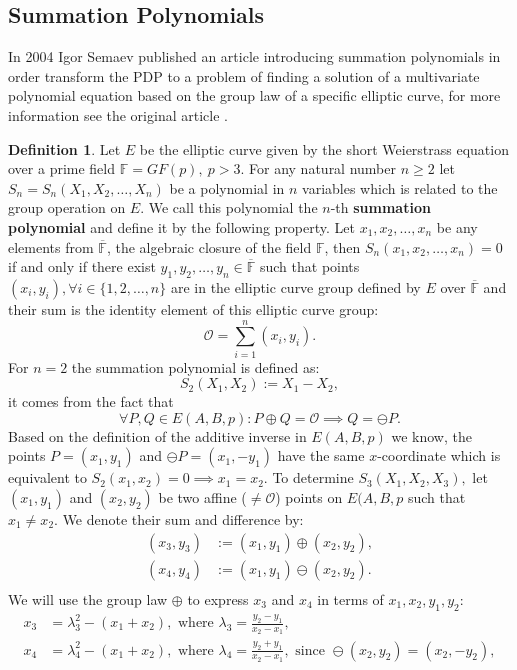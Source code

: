 \documentclass[thesis=M,english]{FITthesis}[2012/10/20]
\theoremstyle{remark}
\theoremstyle{definition}
\newtheorem{DF}{Definition}[section]
\begin{document}
\subsection{Summation Polynomials}
\noindent In 2004 Igor Semaev published an article introducing summation polynomials in order transform the PDP to a problem of finding a solution of a multivariate polynomial equation based on the group law of a specific elliptic curve, for more information see the original article \cite{semaev04}.
\begin{DF}
Let $E$ be the elliptic curve given by the short Weierstrass equation over a prime field $\mathbb{F} = GF(p),\ p > 3$. For any natural number $n \geq 2$ let $S_n = S_n(X_1, X_2, \ldots, X_n)$ be a polynomial in $n$ variables which is related to the group operation on $E$. We call this polynomial the $n$-th \textbf{summation polynomial} and define it by the following property. Let $x_1,x_2,\ldots,x_n$ be any elements from $\overline{\mathbb{F}}$, the algebraic closure of the field $\mathbb{F}$, then $S_n(x_1,x_2,\ldots,x_n)=0$ if and only if there exist $y_1,y_2,\ldots,y_n \in \overline{\mathbb{F}}$ such that points $(x_i,y_i), \forall i \in \{1,2,\ldots,n\}$ are in the elliptic curve group defined by $E$ over $\overline{\mathbb{F}}$ and their sum is the identity element of this elliptic curve group:
$$
\mathcal{O} = \sum_{i=1}^n (x_i,y_i).
$$
For $n=2$ the summation polynomial is defined as: 
$$
S_2(X_1, X_2) := X_1 - X_2,
$$ it comes from the fact that 
$$
\forall P, Q \in E(A,B,p): P \oplus Q = \mathcal{O} \implies  Q = \ominus P.
$$
Based on the definition of the additive inverse in $E(A,B,p)$ we know, the points $P = (x_1,y_1)$ and $\ominus P = (x_1, -y_1)$ have the same $x$-coordinate which is equivalent to $S_2(x_1, x_2) = 0 \implies x_1 = x_2.$ To determine $S_3(X_1,X_2,X_3),$ let $(x_1,y_1)$ and $(x_2, y_2)$ be two affine ($\neq  \mathcal{O}$) points on $E(A,B,p$ such that $x_1 \neq x_2.$ We denote their sum and difference by:
\begin{align*}
(x_3,y_3) &:= (x_1,y_1) \oplus (x_2,y_2),\\
(x_4,y_4) &:= (x_1,y_1) \ominus (x_2,y_2).\\
\end{align*}
We will use the group law $\oplus$ to express $x_3$ and $x_4$ in terms of $x_1,x_2, y_1, y_2$:
\begin{align*}
x_3 &= \lambda_3^2 - (x_1 + x_2), \text{ where } \lambda_3 = \frac{y_2 - y_1}{x_2 - x_1},\\ 
x_4 &= \lambda_4^2 - (x_1 + x_2), \text{ where } \lambda_4 = \frac{y_2 + y_1}{x_2 - x_1}, \text{ since } \ominus (x_2,y_2) = (x_2, -y_2),\\ 

\end{align*}
\end{DF}
\end{document}
